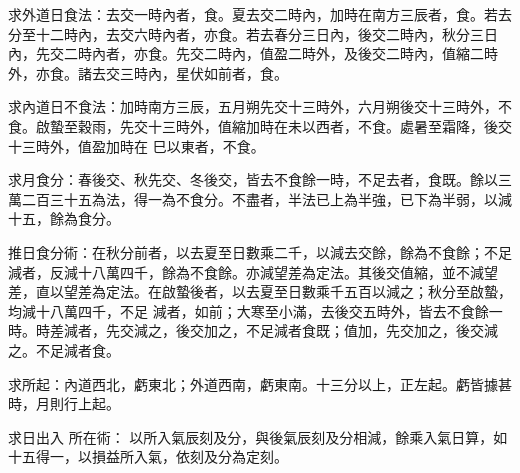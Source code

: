 \begin{pinyinscope}
 求外道日食法：去交一時內者，食。夏去交二時內，加時在南方三辰者，食。若去分至十二時內，去交六時內者，亦食。若去春分三日內，後交二時內，秋分三日內，先交二時內者，亦食。先交二時內，值盈二時外，及後交二時內，值縮二時外，亦食。諸去交三時內，星伏如前者，食。



 求內道日不食法：加時南方三辰，五月朔先交十三時外，六月朔後交十三時外，不食。啟蟄至穀雨，先交十三時外，值縮加時在未以西者，不食。處暑至霜降，後交十三時外，值盈加時在
 巳以東者，不食。



 求月食分：春後交、秋先交、冬後交，皆去不食餘一時，不足去者，食既。餘以三萬二百三十五為法，得一為不食分。不盡者，半法已上為半強，已下為半弱，以減十五，餘為食分。



 推日食分術：在秋分前者，以去夏至日數乘二千，以減去交餘，餘為不食餘；不足減者，反減十八萬四千，餘為不食餘。亦減望差為定法。其後交值縮，並不減望差，直以望差為定法。在啟蟄後者，以去夏至日數乘千五百以減之；秋分至啟蟄，均減十八萬四千，不足
 減者，如前；大寒至小滿，去後交五時外，皆去不食餘一時。時差減者，先交減之，後交加之，不足減者食既；值加，先交加之，後交減之。不足減者食。



 求所起：內道西北，虧東北；外道西南，虧東南。十三分以上，正左起。虧皆據甚時，月則行上起。



 求日出入
 所在術：
 以所入氣辰刻及分，與後氣辰刻及分相減，餘乘入氣日算，如十五得一，以損益所入氣，依刻及分為定刻。



\end{pinyinscope}
